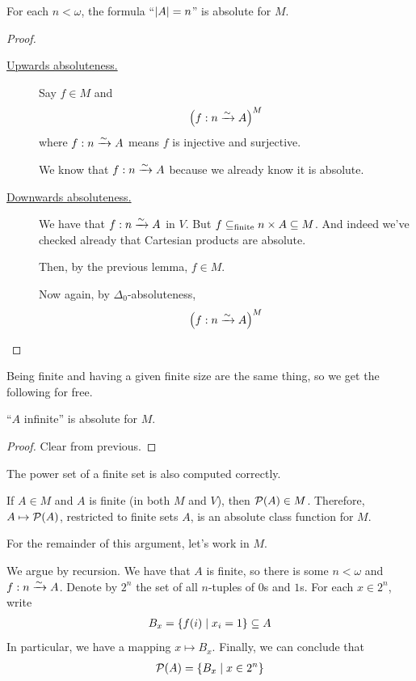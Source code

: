 \begin{boxlemma}
    For each $n < \omega$, the formula ``$\left\lvert A \right\rvert = n$'' is absolute for $M$.
\end{boxlemma}
\begin{proof}
    \hfill 
    \begin{description}
        \item[\underline{Upwards absoluteness.}] Say $f \in M$ and
        \begin{align*}
            \left( f : n \xrightarrow{\sim} A \right)^M
        \end{align*}
        where $f : n \xrightarrow{\sim} A$ means $f$ is injective and surjective.

        We know that $f : n \xrightarrow{\sim} A$ because we already know it is absolute.

        \item[\underline{Downwards absoluteness.}] We have that $f : n \xrightarrow{\sim} A$ in $V$. But $f \subseteq_{\text{finite}} n \times A \subseteq M$. And indeed we've checked already that Cartesian products are absolute.

        Then, by the previous lemma, $f \in M$.

        Now again, by $\Delta_0$-absoluteness,
        \begin{align*}
            \left( f : n \xrightarrow{\sim} A \right)^M
        \end{align*}
    \end{description}
\end{proof}

Being finite and having a given finite size are the same thing, so we get the following for free.

\begin{boxlemma}
    ``$A$ infinite'' is absolute for $M$.
\end{boxlemma}
\begin{proof}
    Clear from previous.
\end{proof}

The power set of a finite set is also computed correctly.

\begin{boxlemma}
    If $A \in M$ and $A$ is finite (in both $M$ and $V$), then $\mathcal{P}(A) \in M$. Therefore, $A \mapsto \mathcal{P}(A)$, restricted to finite sets $A$, is an absolute class function for $M$. %

    For the remainder of this argument, let's work in $M$.
    
    We argue by recursion. We have that $A$ is finite, so there is some $n < \omega$ and $f : n \xrightarrow{\sim} A$. Denote by $2^n$ the set of all $n$-tuples of $0$s and $1$s. For each $x \in 2^n$, write
    \begin{align*}
        B_x = \left\{ f(i) \; \middle\vert \; x_i = 1 \right\} \subseteq A
    \end{align*}
    In particular, we have a mapping $x \mapsto B_x$. Finally, we can conclude that
    \begin{align*}
        \mathcal{P}(A) = \left\{ B_x \; \middle\vert \; x \in 2^n \right\}
    \end{align*}
\end{boxlemma}

